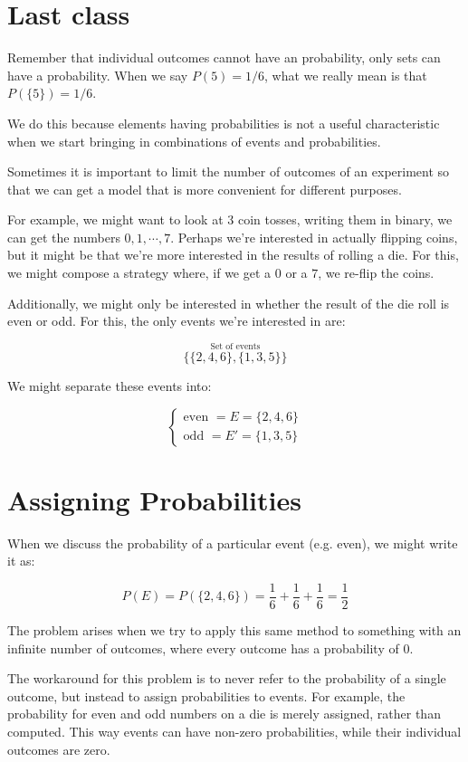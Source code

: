 \documentclass{article}
\begin{document}
\section*{Last class}

Remember that individual outcomes cannot have an probability, only
sets can have a probability. When we say $P(5) = 1/6$, what we really
mean is that $P(\{5\}) = 1/6$.

We do this because elements having probabilities is not a useful
characteristic when we start bringing in combinations of events and
probabilities.

Sometimes it is important to limit the number of outcomes of an
experiment so that we can get a model that is more convenient for
different purposes.

For example, we might want to look at 3 coin tosses, writing them in
binary, we can get the numbers $0, 1, \cdots, 7$. Perhaps we're
interested in actually flipping coins, but it might be that we're more
interested in the results of rolling a die. For this, we might compose
a strategy where, if we get a $0$ or a $7$, we re-flip the coins.

Additionally, we might only be interested in whether the result of the
die roll is even or odd. For this, the only events we're interested in
are:

\[
\overset{\text{Set of events}}{\{\{2, 4, 6\}, \{1, 3, 5\}\}}
\]

We might separate these events into:

\[
\begin{cases}
\text{even } = E = \{2, 4, 6\} \\
\text{odd } = E' = \{1, 3, 5\}
\end{cases}
\]

\section*{Assigning Probabilities}

When we discuss the probability of a particular event (e.g. even), we
might write it as:

\[
P(E) = P(\{2, 4, 6\}) = \frac{1}{6} + \frac{1}{6} + \frac{1}{6} = \frac{1}{2}
\]

The problem arises when we try to apply this same method to something
with an infinite number of outcomes, where every outcome has a
probability of $0$.

The workaround for this problem is to never refer to the probability
of a single outcome, but instead to assign probabilities to
events. For example, the probability for even and odd numbers on a die
is merely assigned, rather than computed. This way events can have
non-zero probabilities, while their individual outcomes are zero.
\end{document}
